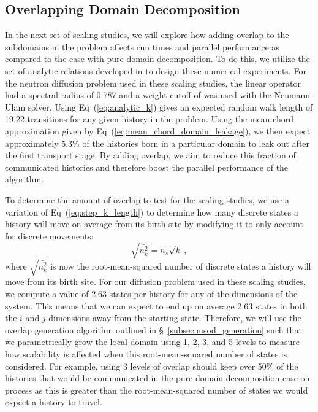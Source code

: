 \documentclass{snamc2013}
\begin{document}
\subsection{Overlapping Domain Decomposition}
\label{subsec:overlapping_domain_decomp}
In the next set of scaling studies, we will explore how adding overlap
to the subdomains in the problem affects run times and parallel
performance as compared to the case with pure domain decomposition. To
do this, we utilize the set of analytic relations developed in
\cite{slattery_spectral_2013} to design these numerical
experiments. For the neutron diffusion problem used in these scaling
studies, the linear operator had a spectral radius of 0.787 and a
weight cutoff of  was used with the Neumann-Ulam
solver. Using Eq~(\ref{eq:analytic_k}) gives an expected random walk
length of 19.22 transitions for any given history in the
problem. Using the mean-chord approximation given by
Eq~(\ref{eq:mean_chord_domain_leakage}), we then expect approximately
5.3\% of the histories born in a particular domain to leak out after
the first transport stage. By adding overlap, we aim to reduce this
fraction of communicated histories and therefore boost the parallel
performance of the algorithm.

To determine the amount of overlap to test for the scaling studies, we
use a variation of Eq~(\ref{eq:step_k_length}) to determine how many
discrete states a history will move on average from its birth site by
modifying it to only account for discrete movements:
\begin{equation}
  \sqrt{\bar{n^2_k}} = n_s \sqrt{k}\:,
  \label{eq:discrete_distance}
\end{equation}
where $\sqrt{\bar{n^2_k}}$ is now the root-mean-squared number of
discrete states a history will move from its birth site. For our
diffusion problem used in these scaling studies, we compute a value of
2.63 states per history for any of the dimensions of the system. This
means that we can expect to end up on average 2.63 states in both the
$i$ and $j$ dimensions away from the starting state. Therefore, we
will use the overlap generation algorithm outlined in
\S~\ref{subsec:msod_generation} such that we parametrically grow the
local domain using 1, 2, 3, and 5 levels to measure how scalability is
affected when this root-mean-squared number of states is
considered. For example, using 3 levels of overlap should keep over
50\% of the histories that would be communicated in the pure domain
decomposition case on-process as this is greater than the
root-mean-squared number of states we would expect a history to
travel.
\end{document}
